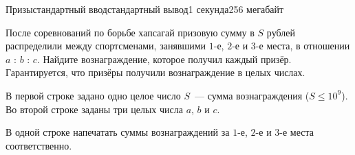\begin{problem}[(Павлов Н.\,Н.)]{Призы}{стандартный ввод}{стандартный вывод}{1 секунда}{256 мегабайт}

После соревнований по борьбе хапсагай призовую сумму в $S$ рублей распределили между спортсменами, занявшими $1$-е, $2$-е и $3$-е места, в отношении $a$ : $b$ : $c$. Найдите вознаграждение, которое получил каждый призёр. Гарантируется, что призёры получили вознаграждение в целых числах.


\InputFile
В первой строке задано одно целое число $S$~--- сумма вознаграждения ($S \le 10^9$). Во второй строке заданы три целых числа $a$, $b$ и $c$.


\OutputFile
В одной строке напечатать суммы вознаграждений за $1$-е, $2$-е и $3$-е места соответственно.


\Example

\begin{example}
%
\end{example}

\end{problem}

